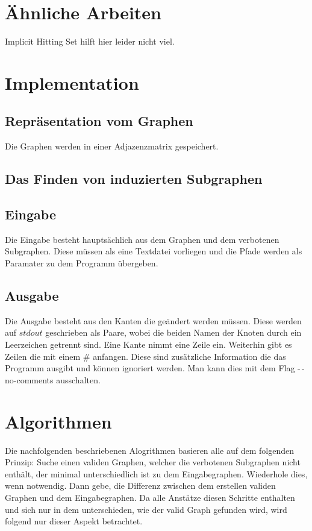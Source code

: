 \documentclass[12pt,a4paper,onecolumn,oneside,titlepage]{article}
\begin{document}
\section{Ähnliche Arbeiten}
Implicit Hitting Set hilft hier leider nicht viel.\cite{Moreno13} 

\section{Implementation}
\subsection{Repräsentation vom Graphen}
Die Graphen werden in einer Adjazenzmatrix gespeichert.

\subsection{Das Finden von induzierten Subgraphen}

\subsection{Eingabe}
Die Eingabe besteht hauptsächlich aus dem Graphen und dem verbotenen Subgraphen. Diese müssen als eine Textdatei vorliegen und die Pfade werden als Paramater zu dem Programm übergeben.

\subsection{Ausgabe}
Die Ausgabe besteht aus den Kanten die geändert werden müssen. Diese werden auf $stdout$ geschrieben als Paare, wobei die beiden Namen der Knoten durch ein Leerzeichen getrennt sind. Eine Kante nimmt eine Zeile ein.
Weiterhin gibt es Zeilen die mit einem \# anfangen. Diese sind zusätzliche Information die das Programm ausgibt und können ignoriert werden. Man kann dies mit dem Flag -\,-no-comments ausschalten.

\section{Algorithmen}
Die nachfolgenden beschriebenen Alogrithmen basieren alle auf dem folgenden Prinzip: Suche einen validen Graphen, welcher die verbotenen Subgraphen nicht enthält, der minimal unterschiedlich ist zu dem Eingabegraphen. Wiederhole dies, wenn notwendig. Dann gebe, die Differenz zwischen dem erstellen validen Graphen und dem Eingabegraphen.
Da alle Anstätze diesen Schritte enthalten und sich nur in dem unterschieden, wie der valid Graph gefunden wird, wird folgend nur dieser Aspekt betrachtet.
\end{document}
